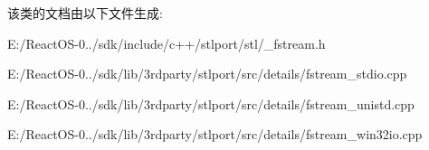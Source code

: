 该类的文档由以下文件生成\+:\begin{DoxyCompactItemize}
\item 
E\+:/\+React\+O\+S-\/0../sdk/include/c++/stlport/stl/\+\_\+fstream.\+h\item 
E\+:/\+React\+O\+S-\/0../sdk/lib/3rdparty/stlport/src/details/fstream\+\_\+stdio.\+cpp\item 
E\+:/\+React\+O\+S-\/0../sdk/lib/3rdparty/stlport/src/details/fstream\+\_\+unistd.\+cpp\item 
E\+:/\+React\+O\+S-\/0../sdk/lib/3rdparty/stlport/src/details/fstream\+\_\+win32io.\+cpp\end{DoxyCompactItemize}
